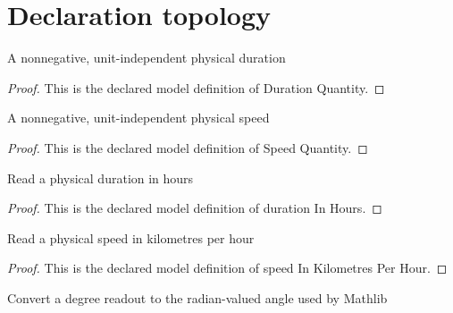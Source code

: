 \section{Declaration topology}
\begin{definition}
  \label{def:physics:phyx-mini-0690:phyxminiproblems-problemphyxmini0690-durationquantity}
  A nonnegative, unit-independent physical duration
\end{definition}
\begin{proof}
  This is the declared model definition of Duration Quantity.
\end{proof}
\begin{definition}
  \label{def:physics:phyx-mini-0690:phyxminiproblems-problemphyxmini0690-speedquantity}
  A nonnegative, unit-independent physical speed
\end{definition}
\begin{proof}
  This is the declared model definition of Speed Quantity.
\end{proof}
\begin{definition}
  \label{def:physics:phyx-mini-0690:phyxminiproblems-problemphyxmini0690-durationinhours}
  Read a physical duration in hours
\end{definition}
\begin{proof}
  This is the declared model definition of duration In Hours.
\end{proof}
\begin{definition}
  \label{def:physics:phyx-mini-0690:phyxminiproblems-problemphyxmini0690-speedinkilometresperhour}
  Read a physical speed in kilometres per hour
\end{definition}
\begin{proof}
  This is the declared model definition of speed In Kilometres Per Hour.
\end{proof}
\begin{definition}
  \label{def:physics:phyx-mini-0690:phyxminiproblems-problemphyxmini0690-angleinradiansfromdegrees}
  Convert a degree readout to the radian-valued angle used by Mathlib
\end{definition}
